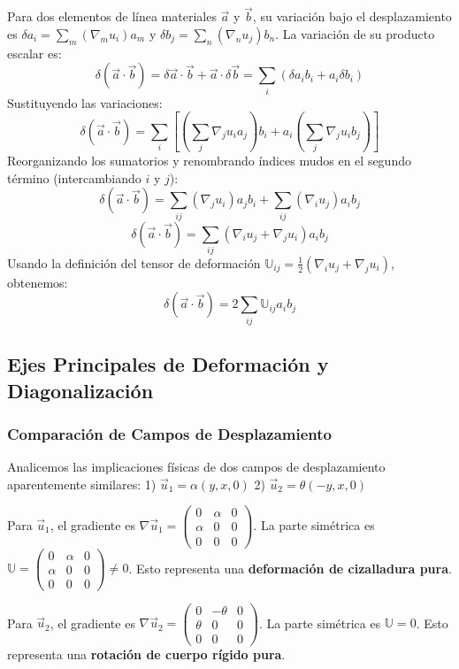Para dos elementos de línea materiales $\vec{a}$ y $\vec{b}$, su variación bajo el desplazamiento es $\delta a_i = \sum_m (\nabla_m u_i) a_m$ y $\delta b_j = \sum_n (\nabla_n u_j) b_n$. La variación de su producto escalar es:
$$ \delta(\vec{a} \cdot \vec{b}) = \delta\vec{a} \cdot \vec{b} + \vec{a} \cdot \delta\vec{b} = \sum_i (\delta a_i b_i + a_i \delta b_i) $$
Sustituyendo las variaciones:
$$ \delta(\vec{a} \cdot \vec{b}) = \sum_i \left[ \left(\sum_j \nabla_j u_i a_j\right) b_i + a_i \left(\sum_j \nabla_j u_i b_j\right) \right] $$
Reorganizando los sumatorios y renombrando índices mudos en el segundo término (intercambiando $i$ y $j$):
$$ \delta(\vec{a} \cdot \vec{b}) = \sum_{ij} (\nabla_j u_i) a_j b_i + \sum_{ij} (\nabla_i u_j) a_i b_j $$
$$ \delta(\vec{a} \cdot \vec{b}) = \sum_{ij} (\nabla_i u_j + \nabla_j u_i) a_i b_j $$
Usando la definición del tensor de deformación $\mathbb{U}_{ij} = \frac{1}{2}(\nabla_i u_j + \nabla_j u_i)$, obtenemos:
$$ \delta(\vec{a} \cdot \vec{b}) = 2 \sum_{ij} \mathbb{U}_{ij} a_i b_j $$

\subsection{Ejes Principales de Deformación y Diagonalización}

\subsubsection{Comparación de Campos de Desplazamiento}

Analicemos las implicaciones físicas de dos campos de desplazamiento aparentemente similares:
1) $\vec{u}_1 = \alpha(y, x, 0)$
2) $\vec{u}_2 = \theta(-y, x, 0)$

Para $\vec{u}_1$, el gradiente es $\nabla \vec{u}_1 = \begin{pmatrix} 0 & \alpha & 0 \\ \alpha & 0 & 0 \\ 0 & 0 & 0 \end{pmatrix}$. La parte simétrica es $\mathbb{U} = \begin{pmatrix} 0 & \alpha & 0 \\ \alpha & 0 & 0 \\ 0 & 0 & 0 \end{pmatrix} \neq 0$. Esto representa una \textbf{deformación de cizalladura pura}.

Para $\vec{u}_2$, el gradiente es $\nabla \vec{u}_2 = \begin{pmatrix} 0 & -\theta & 0 \\ \theta & 0 & 0 \\ 0 & 0 & 0 \end{pmatrix}$. La parte simétrica es $\mathbb{U} = 0$. Esto representa una \textbf{rotación de cuerpo rígido pura}.

